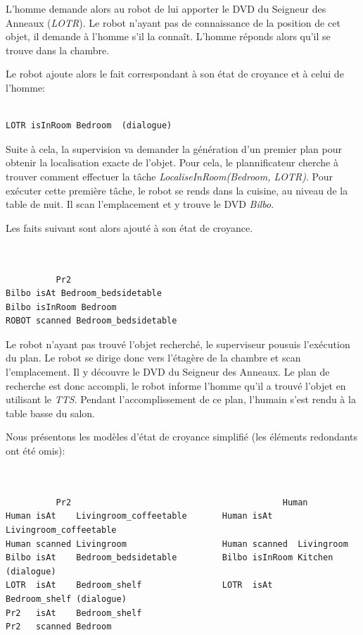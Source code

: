 \documentclass[a4paper,11pt,twoside]{StyleThese}
\begin{document}
L'homme demande alors au robot de lui apporter le DVD du Seigneur des Anneaux (\textit{LOTR}).
Le robot n'ayant pas de connaissance de la position de cet objet, il demande à l'homme s'il la connaît.
L'homme réponds alors qu'il se trouve dans la chambre.

Le robot ajoute alors le fait correspondant à son état de croyance et à celui de l'homme:

\begin{scriptsize}
\begin{verbatim}

LOTR isInRoom Bedroom  (dialogue)

\end{verbatim}
\end{scriptsize}

Suite à cela, la supervision va demander la génération d'un premier plan pour obtenir la localisation exacte de l'objet. Pour cela, le plannificateur cherche à trouver comment effectuer la tâche \textit{LocaliseInRoom(Bedroom, LOTR)}.
Pour exécuter cette première tâche, le robot se rends dans la cuisine, au niveau de la table de nuit. Il scan l'emplacement et y trouve le DVD \textit{Bilbo}.

Les faits suivant sont alors ajouté à son état de croyance.

\begin{scriptsize}
\begin{verbatim}


          Pr2
Bilbo isAt Bedroom_bedsidetable
Bilbo isInRoom Bedroom
ROBOT scanned Bedroom_bedsidetable

\end{verbatim}
\end{scriptsize}

Le robot n'ayant pas trouvé l'objet recherché, le superviseur pousuis l'exécution du plan. Le robot se dirige donc vers l'étagère de la chambre et scan l'emplacement.
Il y découvre le DVD du Seigneur des Anneaux.
Le plan de recherche est donc accompli, le robot informe l'homme qu'il a trouvé l'objet en utilisant le \textit{TTS}.
Pendant l'accomplissement de ce plan, l'humain s'est rendu à la table basse du salon.

Nous présentons les modèles d'état de croyance simplifié (les éléments redondants ont été omis):

\begin{scriptsize}
\begin{verbatim}


          Pr2                                          Human
Human isAt    Livingroom_coffeetable       Human isAt     Livingroom_coffeetable
Human scanned Livingroom                   Human scanned  Livingroom
Bilbo isAt    Bedroom_bedsidetable         Bilbo isInRoom Kitchen (dialogue)
LOTR  isAt    Bedroom_shelf                LOTR  isAt     Bedroom_shelf (dialogue)
Pr2   isAt    Bedroom_shelf                
Pr2   scanned Bedroom

\end{verbatim}
\end{scriptsize}
\end{document}
